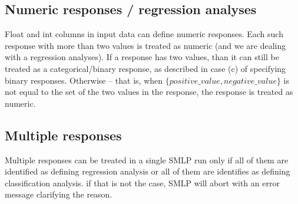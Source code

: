 \documentclass[a4paper,parskip=half]{article} %
\newcommand{\delete}[1]{}
\begin{document}
\subsection{Numeric responses / regression analyses}

Float and int columns in input data can define numeric responses. Each such response with more than 
two values is treated as numeric (and we are dealing with a regression analyses). If a response has 
two values, than it can still be treated as a categorical/binary response, as described in case (c)
of specifying binary responses. Otherwise -- that is, when $\{positive\_value, negative\_value\}$ is not
equal to the set of the two values in the response, the response is treated as numeric. 
\delete{
Parameter values specified through options $positive\_value$ and $negative\_value$ have a different 
meaning for numeric responses: they are not used to replace values in the response as part of 
preprocessing. Instead, $positive\_value = STAT\_POSITIVE\_VALUE$ and $negative\_value = STAT\_NEGATIVE\_VALUE$
(which is the default) specifies that the high values in the response are positive (undesirable) and
the low values are negative (desirable). The opposite assignment $positive\_value$ = $STAT\_NEGATIVE\_VALUE$ 
and $negative\_value = STAT\_POSITIVE\_VALUE$ specifies that low values in the response are positive and
high values are negative. Other possibilities for the pair $(positive\_value, negative\_value)$ are 
considered as incorrect specification and an error message is issued. 
}


\subsection{Multiple responses}

Multiple responses can be treated in a single SMLP run only if all of them are identified as 
defining regression analysis or all of them are identifies as defining classification analysis.
if that is not the case, SMLP will abort with an error message clarifying the reason.
        

\delete{
\subsection{Optimization problems}

If we are dealing with an optimization problem for a response or multiple responses, then combination
$positive\_value = STAT\_POSITIVE\_VALUE$ and $negative\_value = STAT\_NEGATIVE\_VALUE$ specifies that 
we want to maximize the response values (find regions in input space where the responses are
close to maximum / close to pareto optimal with respect to maximization; and conversely, combination
$positive\_value = STAT\_NEGATIVE\_VALUE$ and $negative\_value = STAT\_POSITIVE\_VALUE$ 
specifies that we are looking at (pareto) optimization problem with respect to minimization.
}
\end{document}
